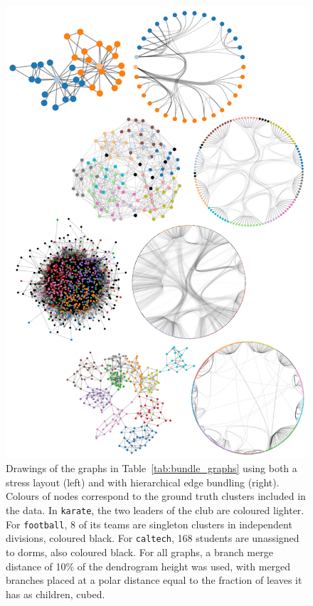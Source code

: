 \begin{figure}
  \centering
  \includegraphics[height=.8\textheight]{power/bundled.png}
  \caption[Final hierarchical edge bundled diagrams]{Drawings of the graphs in Table~\ref{tab:bundle_graphs} using both a stress layout (left) and with hierarchical edge bundling (right). Colours of nodes correspond to the ground truth clusters included in the data. In \texttt{karate}, the two leaders of the club are coloured lighter.
  For \texttt{football}, 8 of its teams are singleton clusters in independent divisions, coloured black. For \texttt{caltech}, 168 students are unassigned to dorms, also coloured black.
  For all graphs, a branch merge distance of 10\% of the dendrogram height was used, with merged branches placed at a polar distance equal to the fraction of leaves it has as children, cubed.}
  \label{fig:untangled_hairballs}
\end{figure}


